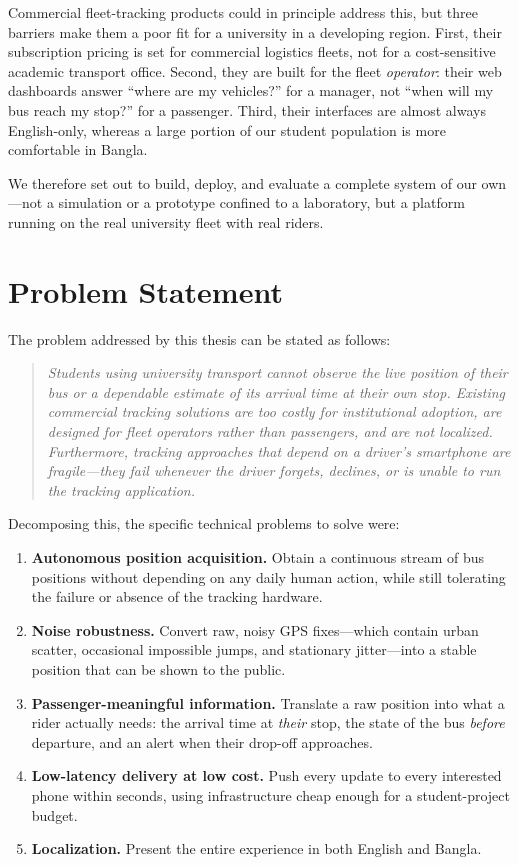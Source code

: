 Commercial fleet-tracking products could in principle address this, but
three barriers make them a poor fit for a university in a developing
region. First, their subscription pricing is set for commercial logistics
fleets, not for a cost-sensitive academic transport office. Second, they
are built for the fleet \emph{operator}: their web dashboards answer
``where are my vehicles?'' for a manager, not ``when will my bus reach my
stop?'' for a passenger. Third, their interfaces are almost always
English-only, whereas a large portion of our student population is more
comfortable in Bangla.

We therefore set out to build, deploy, and evaluate a complete system of
our own---not a simulation or a prototype confined to a laboratory, but a
platform running on the real university fleet with real riders.

\section{Problem Statement}
The problem addressed by this thesis can be stated as follows:

\begin{quote}
\emph{Students using university transport cannot observe the live position
of their bus or a dependable estimate of its arrival time at their own
stop. Existing commercial tracking solutions are too costly for
institutional adoption, are designed for fleet operators rather than
passengers, and are not localized. Furthermore, tracking approaches that
depend on a driver's smartphone are fragile---they fail whenever the
driver forgets, declines, or is unable to run the tracking application.}
\end{quote}

Decomposing this, the specific technical problems to solve were:

\begin{enumerate}
  \item \textbf{Autonomous position acquisition.} Obtain a continuous
  stream of bus positions without depending on any daily human action,
  while still tolerating the failure or absence of the tracking hardware.
  \item \textbf{Noise robustness.} Convert raw, noisy GPS fixes---which
  contain urban scatter, occasional impossible jumps, and stationary
  jitter---into a stable position that can be shown to the public.
  \item \textbf{Passenger-meaningful information.} Translate a raw
  position into what a rider actually needs: the arrival time at
  \emph{their} stop, the state of the bus \emph{before} departure, and an
  alert when their drop-off approaches.
  \item \textbf{Low-latency delivery at low cost.} Push every update to
  every interested phone within seconds, using infrastructure cheap enough
  for a student-project budget.
  \item \textbf{Localization.} Present the entire experience in both
  English and Bangla.
\end{enumerate}

